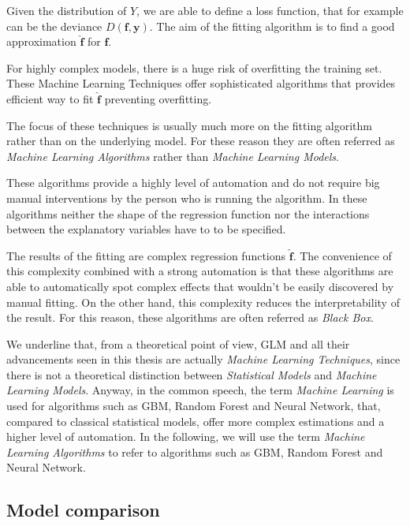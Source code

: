 \documentclass[a4paper, nobind]{templates/ociamthesis}
\theoremstyle{definition}
\theoremstyle{definition}
\theoremstyle{definition}
\theoremstyle{remark}
\begin{document}
Given the distribution of \(Y\), we are able to define a loss function, that for example can be the deviance \(D(\boldsymbol{f}, \boldsymbol{y})\). The aim of the fitting algorithm is to find a good approximation \(\hat{\boldsymbol{f}}\) for \(\boldsymbol{f}\).

For highly complex models, there is a huge risk of overfitting the training set. These Machine Learning Techniques offer sophisticated algorithms that provides efficient way to fit \(\hat{\boldsymbol{f}}\) preventing overfitting.

The focus of these techniques is usually much more on the fitting algorithm rather than on the underlying model. For these reason they are often referred as \emph{Machine Learning Algorithms} rather than \emph{Machine Learning Models}.

These algorithms provide a highly level of automation and do not require big manual interventions by the person who is running the algorithm. In these algorithms neither the shape of the regression function nor the interactions between the explanatory variables have to to be specified.

The results of the fitting are complex regression functions \(\hat{\boldsymbol{f}}\). The convenience of this complexity combined with a strong automation is that these algorithms are able to automatically spot complex effects that wouldn't be easily discovered by manual fitting. On the other hand, this complexity reduces the interpretability of the result. For this reason, these algorithms are often referred as \emph{Black Box}.

We underline that, from a theoretical point of view, GLM and all their advancements seen in this thesis are actually \emph{Machine Learning Techniques}, since there is not a theoretical distinction between \emph{Statistical Models} and \emph{Machine Learning Models}. Anyway, in the common speech, the term \emph{Machine Learning} is used for algorithms such as GBM, Random Forest and Neural Network, that, compared to classical statistical models, offer more complex estimations and a higher level of automation. In the following, we will use the term \emph{Machine Learning Algorithms} to refer to algorithms such as GBM, Random Forest and Neural Network.

\hypertarget{chap:model-comparison}{%
\subsection{Model comparison}\label{chap:model-comparison}}
\end{document}
